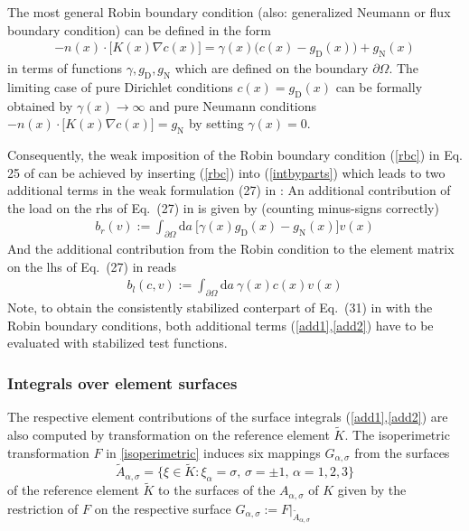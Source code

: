 \documentclass[12pt]{report}
\begin{document}
The most general Robin boundary condition (also: generalized Neumann
or flux boundary condition) can be defined in the form
\begin{eqnarray}\label{rbc}
  -n(x)\cdot\bigl[K(x)\nabla c(x)\bigr]=\gamma(x)\big(c(x)-g_{\mathrm{D}}(x)\big)+g_{\mathrm{N}}(x)
\end{eqnarray}
in terms of functions $\gamma,g_{\mathrm{D}},g_{\mathrm{N}}$ which are
defined on the boundary $\partial\Omega$. The limiting case of pure
Dirichlet conditions $c(x)=g_{\mathrm{D}}(x)$ can be formally obtained
by $\gamma(x)\to\infty$ and pure Neumann conditions
$-n(x)\cdot\bigl[K(x)\nabla c(x)\bigr]=g_{\mathrm{N}}$ by setting
$\gamma(x)=0$.

Consequently, the weak imposition of the Robin boundary condition
(\ref{rbc}) in Eq. 25 of \cite{ryser_2004} can be achieved by
inserting (\ref{rbc}) into (\ref{intbyparts}) which leads to two
additional terms in the weak formulation (27) in \cite{ryser_2004}: An
additional contribution of the load on the rhs of Eq.\ (27) in
\cite{ryser_2004} is given by (counting minus-signs correctly)
\begin{eqnarray}\label{add1}
  b_r(v) := \int_{\partial\Omega} \mathrm{d}a\ \bigl[\gamma(x)g_{\mathrm{D}}(x)-g_{\mathrm{N}}(x)\bigr]v(x)
\end{eqnarray}
And the additional contribution from the Robin condition to the
element matrix on the lhs of Eq.\ (27) in \cite{ryser_2004} reads
\begin{eqnarray}\label{add2}
  b_l(c,v) := \int_{\partial\Omega} \mathrm{d}a\ \gamma(x)c(x)v(x) 
\end{eqnarray}
Note, to obtain the consistently stabilized conterpart of Eq.\ (31) in
\cite{ryser_2004} with the Robin boundary conditions, both additional
terms (\ref{add1},\ref{add2}) have to be evaluated with stabilized test
functions.


\subsubsection{Integrals over element surfaces}
The respective element contributions of the surface integrals
(\ref{add1},\ref{add2}) are also computed by transformation on the
reference element $\tilde{K}$. The isoperimetric transformation $F$ in
\ref{isoperimetric} induces six mappings $G_{\alpha,\sigma}$ from the
surfaces
\begin{equation}
  \tilde{A}_{\alpha,\sigma}=
  \{\xi \in \tilde{K} : \xi_{\alpha}=\sigma,\,
  \sigma= \pm 1,\,
  \alpha= 1,2,3\}
\end{equation}
of the reference element $\tilde{K}$ to the surfaces of the
${A}_{\alpha,\sigma}$ of $K$ given by the restriction of $F$ on the
respective surface $G_{\alpha,\sigma}:=F|_{\tilde{A}_{\alpha,\sigma}}$
\end{document}
